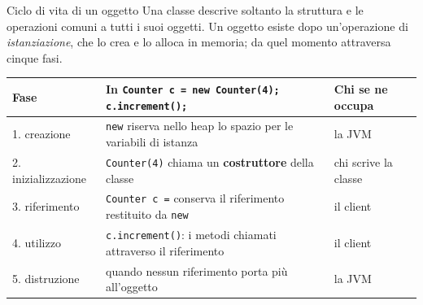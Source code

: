 \documentclass[10pt,aspectratio=169]{beamer}
\begin{document}
\begin{frame}[fragile]{Ciclo di vita di un oggetto}
\small
Una classe descrive soltanto la struttura e le operazioni comuni a tutti i suoi oggetti. Un oggetto esiste dopo un'operazione di \emph{istanziazione}, che lo crea e lo alloca in memoria; da quel momento attraversa cinque fasi.


\begin{center}
\renewcommand{\arraystretch}{1.2}
\begin{tabular}{@{}lll@{}}
\toprule
\textbf{Fase} & \textbf{In} \texttt{Counter c = new Counter(4); c.increment();} & \textbf{Chi se ne occupa} \\
\midrule
1. creazione & \texttt{new} riserva nello heap lo spazio per le variabili di istanza & la JVM \\
2. inizializzazione & \texttt{Counter(4)} chiama un \textbf{costruttore} della classe & chi scrive la classe \\
3. riferimento & \texttt{Counter c =} conserva il riferimento restituito da \texttt{new} & il client \\
4. utilizzo & \texttt{c.increment()}: i metodi chiamati attraverso il riferimento & il client \\
5. distruzione & quando nessun riferimento porta più all'oggetto & la JVM \\
\bottomrule
\end{tabular}
\end{center}
\end{frame}
\end{document}
